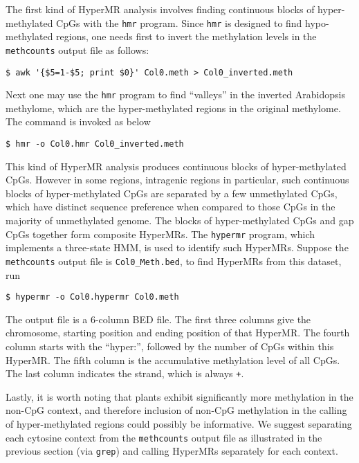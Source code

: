 \documentclass[10pt]{article}
\newcommand{\prog}[1]{\texttt{#1}}
\newcommand{\fn}[1]{\texttt{#1}}
\newcommand{\lit}[1]{\texttt{#1}}
\begin{document}
The first kind of HyperMR analysis involves finding continuous blocks
of hyper-methylated CpGs with the \prog{hmr} program. Since \prog{hmr}
is designed to find hypo-methylated regions, one needs first to invert
the methylation levels in the \prog{methcounts} output file as
follows:

\begin{verbatim}
$ awk '{$5=1-$5; print $0}' Col0.meth > Col0_inverted.meth
\end{verbatim}

Next one may use the \prog{hmr} program to find ``valleys'' in the
inverted Arabidopsis methylome, which are the hyper-methylated regions
in the original methylome. The command is invoked as below

\begin{verbatim}
$ hmr -o Col0.hmr Col0_inverted.meth
\end{verbatim}

This kind of HyperMR analysis produces continuous blocks of
hyper-methylated CpGs. However in some regions, intragenic regions in
particular, such continuous blocks of hyper-methylated CpGs are
separated by a few unmethylated CpGs, which have distinct sequence
preference when compared to those CpGs in the majority of unmethylated
genome. The blocks of hyper-methylated CpGs and gap CpGs together form
composite HyperMRs. The \prog{hypermr} program, which implements a
three-state HMM, is used to identify such HyperMRs. Suppose the
\prog{methcounts} output file is \fn{Col0\_Meth.bed}, to find HyperMRs
from this dataset, run

\begin{verbatim}
$ hypermr -o Col0.hypermr Col0.meth
\end{verbatim}

The output file is a 6-column BED file. The first three columns give
the chromosome, starting position and ending position of that
HyperMR. The fourth column starts with the ``hyper:'', followed by the
number of CpGs within this HyperMR. The fifth column is the
accumulative methylation level of all CpGs. The last column indicates
the strand, which is always \lit{+}.

Lastly, it is worth noting that plants exhibit significantly more
methylation in the non-CpG context, and therefore inclusion of non-CpG
methylation in the calling of hyper-methylated regions could possibly
be informative. We suggest separating each cytosine context from the
\prog{methcounts} output file as illustrated in the previous section
(via \prog{grep}) and calling HyperMRs separately for each context.
\end{document}
